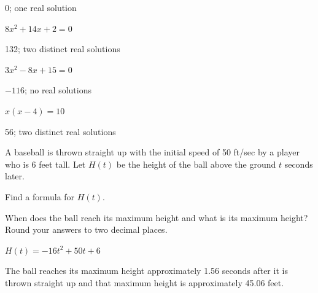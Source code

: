 \begin{solution}
     0; one real solution
\end{solution}



\begin{exercise}
$8x^2+14x+2=0$
\end{exercise}

\begin{solution}
    132; two distinct real solutions
\end{solution}



\begin{exercise}
$3x^2-8x+15=0$
\end{exercise}

\begin{solution}
    $-116$; no real solutions
\end{solution}



\begin{exercise}\label{exercise-3.4.14}
$x(x-4)=10$
\end{exercise}

\begin{solution}
     56; two distinct real solutions
\end{solution}







\begin{exercise}
A baseball is thrown straight up with the initial speed of 50 ft/sec by a player who is 6 feet tall. Let $H(t)$ be the height of the ball above the ground $t$ seconds later. 

    \begin{parts}
        \item Find a formula for $H(t)$.
    
        \item When does the ball reach its maximum height and what is its maximum height? Round your answers to two decimal places.
    \end{parts}

\end{exercise}


\begin{solution}
    \begin{parts}
        \item  $H(t)=-16t^2+50t+6$
        \item  The ball reaches its maximum height approximately 1.56 seconds after it is thrown straight up and that maximum height is approximately 45.06 feet.
    \end{parts}
\end{solution}






